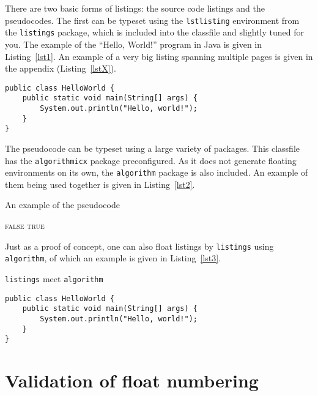 \documentclass[times, %
               specification,annotation, %
               titlepage-extra-ru,specification-extra-ru,annotation-extra-ru, %
               languages={russian,english} %
              ]{itmo-student-thesis}
\begin{document}
There are two basic forms of listings: the source code listings and the pseudocodes.
The first can be typeset using the \texttt{lstlisting} environment from the \texttt{listings} package,
which is included into the classfile and slightly tuned for you.
The example of the ``Hello, World!'' program in Java is given in Listing~\ref{lst1}.
An example of a very big listing spanning multiple pages is given in the appendix (Listing~\ref{lstX}).

\begin{lstlisting}[float=!h,caption={An example of the source code in Java},label={lst1}]
public class HelloWorld {
    public static void main(String[] args) {
        System.out.println("Hello, world!");
    }
}
\end{lstlisting}

The pseudocode can be typeset using a large variety of packages. This classfile has the \texttt{algorithmicx} package preconfigured.
As it does not generate floating environments on its own, the \texttt{algorithm} package is also included.
An example of them being used together is given in Listing~\ref{lst2}.

\begin{algorithm}[!h]
\caption{An example of the pseudocode}\label{lst2}
\begin{algorithmic}
				\State\Return \textsc{false}
			\EndIf
		\EndFor
		\State\Return \textsc{true}
	\EndFunction
\end{algorithmic}
\end{algorithm}

Just as a proof of concept, one can also float listings by \texttt{listings} using \texttt{algorithm},
of which an example is given in Listing~\ref{lst3}.

\begin{algorithm}[!h]
\caption{\texttt{listings} meet \texttt{algorithm}}\label{lst3}
\begin{lstlisting}
public class HelloWorld {
    public static void main(String[] args) {
        System.out.println("Hello, world!");
    }
}
\end{lstlisting}
\end{algorithm}

\chapter{Validation of float numbering}
\end{document}
